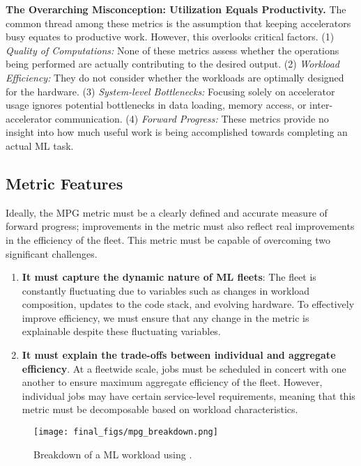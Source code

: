 \textbf{The Overarching Misconception: Utilization Equals Productivity.}
The common thread among these metrics is the assumption that keeping accelerators busy equates to productive work. However, this overlooks critical factors. (1) \textit{Quality of Computations:} None of these metrics assess whether the operations being performed are actually contributing to the desired output. (2) \textit{Workload Efficiency:} They do not consider whether the workloads are optimally designed for the hardware. (3) \textit{System-level Bottlenecks:} Focusing solely on accelerator usage ignores potential bottlenecks in data loading, memory access, or inter-accelerator communication. (4) \textit{Forward Progress:} These metrics provide no insight into how much useful work is being accomplished towards completing an actual ML task.







\subsection{Metric Features}
Ideally, the MPG metric must be a clearly defined and accurate measure of forward progress; improvements in the metric must also reflect real improvements in the efficiency of the fleet. This metric must be capable of overcoming two significant challenges.

\begin{enumerate}
\item \textbf{It must capture the dynamic nature of ML fleets}: The fleet is constantly fluctuating due to variables such as changes in workload composition, updates to the code stack, and evolving hardware. To effectively improve efficiency, we must ensure that any change in the metric is explainable despite these fluctuating variables.
\item \textbf{It must explain the trade-offs between individual and aggregate efficiency}. At a fleetwide scale, jobs must be scheduled in concert with one another to ensure maximum aggregate efficiency of the fleet. However, individual jobs may have certain service-level requirements, meaning that this metric must be decomposable based on workload characteristics.
\end{enumerate}

\begin{figure}[t]
    \centering
    \texttt{[image: final\_figs/mpg\_breakdown.png]}
    \caption{Breakdown of a ML workload using \mpg. 
    }
    \label{fig:mpg_breakdown}
\end{figure}


